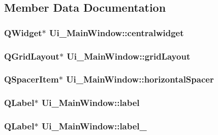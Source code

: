 \subsection{Member Data Documentation}
\hypertarget{classUi__MainWindow_a356f1cf3ebda15f1fac59467ee081b74}{
\subsubsection[{centralwidget}]{\setlength{\rightskip}{0pt plus 5cm}QWidget$\ast$ {\bf Ui\_\-MainWindow::centralwidget}}}
\label{classUi__MainWindow_a356f1cf3ebda15f1fac59467ee081b74}
\hypertarget{classUi__MainWindow_a525ed3c5fe0784ac502ee222fba4e205}{
\subsubsection[{gridLayout}]{\setlength{\rightskip}{0pt plus 5cm}QGridLayout$\ast$ {\bf Ui\_\-MainWindow::gridLayout}}}
\label{classUi__MainWindow_a525ed3c5fe0784ac502ee222fba4e205}
\hypertarget{classUi__MainWindow_a7871ea8c4b6c595d7ccd53960b344719}{
\subsubsection[{horizontalSpacer}]{\setlength{\rightskip}{0pt plus 5cm}QSpacerItem$\ast$ {\bf Ui\_\-MainWindow::horizontalSpacer}}}
\label{classUi__MainWindow_a7871ea8c4b6c595d7ccd53960b344719}
\hypertarget{classUi__MainWindow_ad9c89133780f28e6efa2ec17ceb9cff5}{
\subsubsection[{label}]{\setlength{\rightskip}{0pt plus 5cm}QLabel$\ast$ {\bf Ui\_\-MainWindow::label}}}
\label{classUi__MainWindow_ad9c89133780f28e6efa2ec17ceb9cff5}
\hypertarget{classUi__MainWindow_a9dc4dba26b83e0c94aa566e1c564420b}{
\subsubsection[{label\_\-10}]{\setlength{\rightskip}{0pt plus 5cm}QLabel$\ast$ {\bf Ui\_\-MainWindow::label\_}}}
